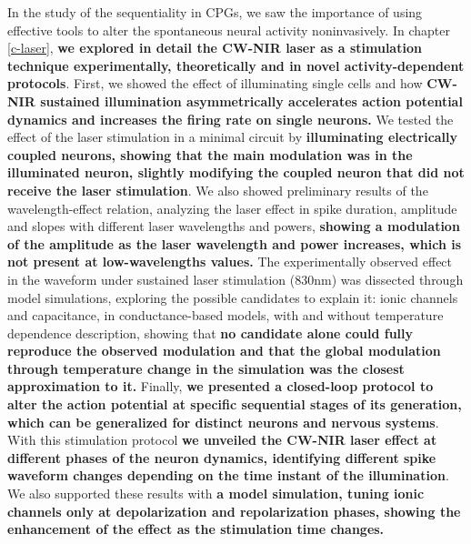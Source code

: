In the study of the sequentiality in CPGs, we saw the importance of using effective tools to alter the spontaneous neural activity noninvasively. In chapter \ref{c-laser}, \textbf{we explored in detail the CW-NIR laser as a stimulation technique experimentally, theoretically and in novel  activity-dependent protocols}. First, we showed the effect of illuminating single cells and how \textbf{CW-NIR sustained illumination asymmetrically accelerates action potential dynamics and increases the firing rate on single neurons.} We tested the effect of the laser stimulation in a minimal circuit by \textbf{illuminating electrically coupled neurons, showing that the main modulation was in the illuminated neuron, slightly modifying the coupled neuron that did not receive the laser stimulation}. We also showed preliminary results of the wavelength-effect relation, analyzing the laser effect in spike duration, amplitude and slopes with different laser wavelengths and powers, \textbf{showing a modulation of the amplitude as the laser wavelength and power increases, which is not present at low-wavelengths values.} The experimentally observed effect in the waveform under sustained laser stimulation (830nm) was dissected through model simulations, exploring the possible candidates to explain it: ionic channels and capacitance, in conductance-based models, with and without temperature dependence description, showing that \textbf{no candidate alone could fully reproduce the observed modulation and that the global modulation through temperature change in the simulation was the closest approximation to it.} Finally, \textbf{we presented a closed-loop protocol to alter the action potential at specific sequential stages of its generation, which can be generalized for distinct neurons and nervous systems}. With this stimulation protocol \textbf{we unveiled the CW-NIR laser effect at different phases of the neuron dynamics,  identifying different spike waveform changes depending on the time instant of the illumination}. We also supported these results with \textbf{a model simulation, tuning ionic channels only at depolarization and repolarization phases, showing the enhancement of the effect as the stimulation time changes.}

